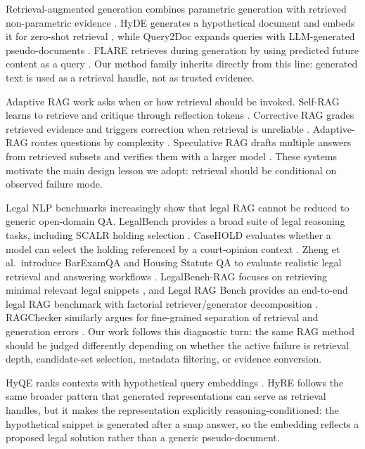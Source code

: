 \documentclass{article}
\newcommand{\hyre}{HyRE}
\begin{document}
Retrieval-augmented generation combines parametric generation with retrieved
non-parametric evidence \citep{lewis2020rag}. HyDE generates a hypothetical
document and embeds it for zero-shot retrieval \citep{gao2023hyde}, while
Query2Doc expands queries with LLM-generated pseudo-documents
\citep{wang2023query2doc}. FLARE retrieves during generation by using
predicted future content as a query \citep{jiang2023flare}. Our method family
inherits directly from this line: generated text is used as a retrieval
handle, not as trusted evidence.

Adaptive RAG work asks when or how retrieval should be invoked. Self-RAG
learns to retrieve and critique through reflection tokens
\citep{asai2024selfrag}. Corrective RAG grades retrieved evidence and triggers
correction when retrieval is unreliable \citep{yan2024crag}. Adaptive-RAG
routes questions by complexity \citep{jeong2024adaptive}. Speculative RAG
drafts multiple answers from retrieved subsets and verifies them with a larger
model \citep{wang2025specrag}. These systems motivate the main design lesson
we adopt: retrieval should be conditional on observed failure mode.

Legal NLP benchmarks increasingly show that legal RAG cannot be reduced to
generic open-domain QA. LegalBench provides a broad suite of legal reasoning
tasks, including SCALR holding selection \citep{guha2023legalbench}.
CaseHOLD evaluates whether a model can select the holding referenced by a
court-opinion context \citep{zheng2021casehold}. Zheng et al.\ introduce
BarExamQA and Housing Statute QA to evaluate realistic legal retrieval and
answering workflows \citep{zheng2025legalretrieval}. LegalBench-RAG focuses on
retrieving minimal relevant legal snippets \citep{pipitone2024legalbenchrag},
and Legal RAG Bench provides an end-to-end legal RAG benchmark with factorial
retriever/generator decomposition \citep{butler2026legalragbench}. RAGChecker
similarly argues for fine-grained separation of retrieval and generation
errors \citep{ru2024ragchecker}. Our work follows this diagnostic turn: the
same RAG method should be judged differently depending on whether the active
failure is retrieval depth, candidate-set selection, metadata filtering, or
evidence conversion.

HyQE ranks contexts with hypothetical query embeddings \citep{zhou2024hyqe}.
\hyre{} follows the same broader pattern that generated representations can
serve as retrieval handles, but it makes the representation explicitly
reasoning-conditioned: the hypothetical snippet is generated after a snap
answer, so the embedding reflects a proposed legal solution rather than a
generic pseudo-document.
\end{document}
